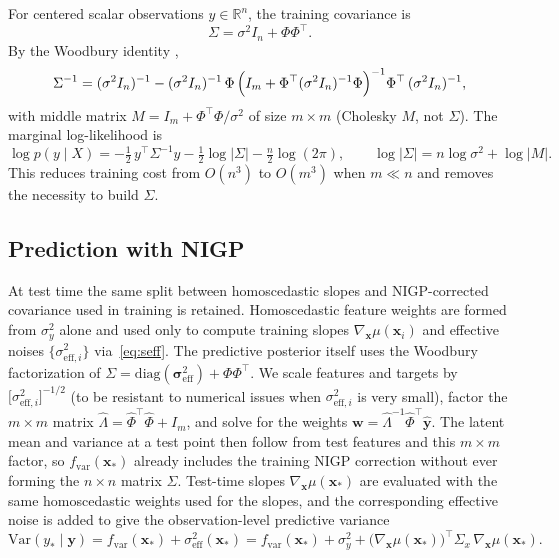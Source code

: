 \documentclass[11pt]{article}
\newcommand{\noise}{\sigma^2}
\newcommand{\Sig}{\Sigma}
\newcommand{\Ph}{\Phi}
\newcommand{\gradmu}{\nabla_{\mathbf{x}}\mu}
\newcommand{\Sigx}{\Sigma_{x}}
\newcommand{\noisey}{\sigma_y^{2}}
\newcommand{\di}{\sigma_{\mathrm{eff},i}^{2}}
\newcommand{\seffvec}{\boldsymbol{\sigma}_{\mathrm{eff}}^{2}}
\begin{document}
For centered scalar observations $y \in \mathbb{R}^n$, the training covariance is
\begin{equation}
  \label{eq:sigma-scalar}
  \Sig = \noise I_n + \Ph\Ph^\top.
\end{equation}
By the Woodbury identity \citep{cutajar2017dgp},
\begin{equation}
  \label{eq:woodbury-scalar}
  \Sig^{-1}
  = (\noise I_n)^{-1}
  - (\noise I_n)^{-1}\,
    \Ph\,
    \Bigl(I_m + \Ph^{\top}(\noise I_n)^{-1}\Ph\Bigr)^{-1}
    \Ph^{\top}\,
    (\noise I_n)^{-1},
\end{equation}
with middle matrix $M = I_m + \Ph^{\top}\Ph/\noise$ of size $m \times m$ (Cholesky $M$, not $\Sig$).
The marginal log-likelihood is
\begin{equation}
  \label{eq:mll}
  \log p(y \mid X)
  = -\tfrac{1}{2}\,y^\top \Sig^{-1} y
  - \tfrac{1}{2}\log|\Sig|
  - \tfrac{n}{2}\log(2\pi),
  \qquad
  \log|\Sig| = n\log\noise + \log|M|.
\end{equation}
This reduces training cost from $O(n^3)$ to $O(m^3)$ when $m \ll n$ and removes the necessity to build $\Sig$.

\subsection{Prediction with NIGP}
\label{sec:nigp-prediction}
At test time the same split between homoscedastic slopes and NIGP-corrected covariance
used in training is retained.
Homoscedastic feature weights are formed from $\noisey$ alone and used only to compute
training slopes $\gradmu(\mathbf{x}_i)$ and effective noises $\{\di\}$
via~\eqref{eq:seff}.
The predictive posterior itself uses the Woodbury factorization of
$\Sig=\mathrm{diag}(\seffvec)+\Ph\Ph^{\top}$. We scale features and targets by
${\bigl[\di\bigr]}^{-1/2}$ (to be resistant to numerical issues when $\di$ is very small), factor the $m\times m$ matrix
$\widehat{\Lambda}=\widehat{\Ph}^{\top}\widehat{\Ph}+I_m$, and solve for the weights
$\mathbf{w}=\widehat{\Lambda}^{-1}\widehat{\Ph}^{\top}\widehat{\mathbf{y}}$.
The latent mean and variance at a test point then follow from test features and this
$m\times m$ factor, so $f_{\mathrm{var}}(\mathbf{x}_*)$ already includes the training
NIGP correction without ever forming the $n\times n$ matrix $\Sig$.
Test-time slopes $\gradmu(\mathbf{x}_*)$ are evaluated with the same homoscedastic
weights used for the slopes, and the corresponding effective noise is added to give the
observation-level predictive variance
\begin{equation}
\label{eq:nigp-pred}
  \mathrm{Var}(y_*\mid\mathbf{y})
  =
  f_{\mathrm{var}}(\mathbf{x}_*)
  +
  \sigma_{\mathrm{eff}}^{2}(\mathbf{x}_*)
  =
  f_{\mathrm{var}}(\mathbf{x}_*)
  +
  \noisey
  +
  \bigl(\gradmu(\mathbf{x}_*)\bigr)^{\!\top}
  \Sigx\,
  \gradmu(\mathbf{x}_*).
\end{equation}
\end{document}
